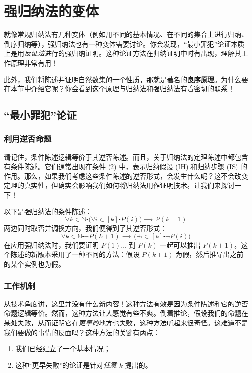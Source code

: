 \section{强归纳法的变体}

就像常规归纳法有几种变体（例如用不同的基本情况、在不同的集合上进行归纳、倒序归纳等），强归纳法也有一种变体需要讨论。你会发现，``最小罪犯''论证本质上是用\emph{反证法}进行的强归纳证明。这种论证方法在归纳证明中时有出现，理解其工作原理非常有用！

此外，我们将陈述并证明自然数集的一个性质，那就是著名的\textbf{良序原理}。为什么要在本节中介绍它呢？你会看到这个原理与归纳法和强归纳法有着密切的联系！

\subsection{``最小罪犯''论证}

\subsubsection*{利用逆否命题}

请记住，条件陈述逻辑等价于其逆否陈述。而且，关于归纳法的定理陈述中都包含有条件陈述。它们通常出现在条件 (2) 中，表示归纳假设 (IH) 和归纳步骤 (IS) 的作用。那么，如果我们考虑这些条件陈述的逆否形式，会发生什么呢？这不会改变定理的真实性，但确实会影响我们如何将归纳法用作证明技术。让我们来探讨一下！

以下是强归纳法的条件陈述：
\[\forall k \in \mathbb{N} \centerdot \big(\forall i \in [k] \centerdot P(i)\big) \implies P(k+1)\]
两边同时取否并调换方向，我们便得到了其逆否形式：
\[\forall k \in \mathbb{N} \centerdot \neg P(k+1) \implies \big(\exists i \in [k] \centerdot \neg P(i)\big)\]
在应用强归纳法时，我们要证明 $P(1) \dots$ 到 $P(k)$ 一起可以推出 $P(k+1)$。这个陈述的新版本采用了一种不同的方法：假设 $P(k+1)$ 为假，然后推导出之前的某个实例也为假。

\subsubsection*{工作机制}

从技术角度讲，这里并没有什么新内容！这种方法有效是因为条件陈述和它的逆否命题逻辑等价。然而，这种方法让人感觉有些不爽。倒着推论，假设我们的命题在某处失败，从而证明它在\emph{更早的}地方也失败，这种方法听起来很奇怪。这难道不是我们要做的事情的反面吗？这种方法的关键有两点：
\begin{enumerate}[label=(\arabic*)]
    \item 我们已经建立了一个基本情况；
    \item 这种``更早失败''的论证是针对\emph{任意} $k$ 提出的。
\end{enumerate}

